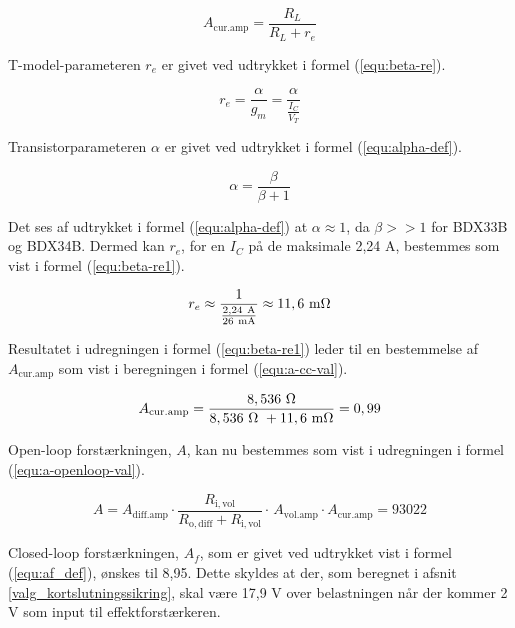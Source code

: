 \begin{equation}
\label{equ:a-cc}
A_\mathrm{cur.amp} = \frac{R_L}{R_L+r_e}
\end{equation}

T-model-parameteren $r_e$ er givet ved udtrykket i formel (\ref{equ:beta-re}).

\begin{equation}
\label{equ:beta-re}
r_e = \frac{\alpha}{g_m} = \frac{\alpha}{\frac{I_C}{V_T}}
\end{equation}

Transistorparameteren $\alpha$ er givet ved udtrykket i formel (\ref{equ:alpha-def}).

\begin{equation}
\label{equ:alpha-def}
\alpha = \frac{\beta}{\beta + 1}
\end{equation}

Det ses af udtrykket i formel (\ref{equ:alpha-def}) at $\alpha \approx 1$, da $\beta>>1$ for BDX33B og BDX34B. Dermed kan $r_e$, for en $I_C$ på de maksimale 2,24 A, bestemmes som vist i formel (\ref{equ:beta-re1}).

\begin{equation}
\label{equ:beta-re1}
r_e \approx \frac{1}{\frac{\mathrm{2,24~A}}{\mathrm{26~mA}}} \approx \mathrm{11,6~m\ohm}
\end{equation}

Resultatet i udregningen i formel (\ref{equ:beta-re1}) leder til en bestemmelse af $A_\mathrm{cur.amp}$ som vist i beregningen i formel (\ref{equ:a-cc-val}).

\begin{equation}
\label{equ:a-cc-val}
A_\mathrm{cur.amp} = \frac{\mathrm{8,536~\ohm}}{\mathrm{8,536~\ohm~} + \mathrm{11,6~m\ohm}} = 0,99
\end{equation}

Open-loop forstærkningen, $A$, kan nu bestemmes som vist i udregningen i formel (\ref{equ:a-openloop-val}).

\begin{equation}
\label{equ:a-openloop-val}
A = A_\mathrm{diff.amp} \cdot \frac{R_\mathrm{i,vol}}{R_\mathrm{o,diff} + R_\mathrm{i,vol}} \cdot \frac{}{} A_\mathrm{vol.amp} \cdot A_\mathrm{cur.amp} = 93022
\end{equation}

Closed-loop forstærkningen, $A_f$, som er givet ved udtrykket vist i formel (\ref{equ:af_def}), ønskes til 8,95. Dette skyldes at der, som beregnet i afsnit \ref{valg_kortslutningssikring}, skal være 17,9 V over belastningen når der kommer 2 V som input til effektforstærkeren.

